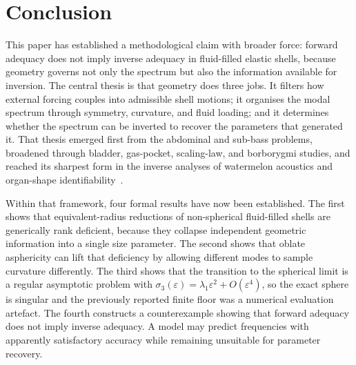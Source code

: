 
\section{Conclusion}
\label{sec:conclusion}

This paper has established a methodological claim with broader force:
forward adequacy does not imply inverse adequacy in fluid-filled elastic shells,
because geometry governs not only the spectrum but also the information
available for inversion.  The central thesis is that geometry does three
jobs.  It filters how external forcing couples into admissible shell motions; it
organises the modal spectrum through symmetry, curvature, and fluid loading; and
it determines whether the spectrum can be inverted to recover the parameters
that generated it.  That thesis emerged first from the abdominal and sub-bass
problems, broadened through bladder, gas-pocket, scaling-law, and borborygmi
studies, and reached its sharpest form in the inverse analyses of watermelon
acoustics and organ-shape identifiability~\cite{BrowntoneP1,BrowntoneP2,BrowntoneP3,BrowntoneP4,BrowntoneP5,BrowntoneP6,BrowntoneP7,BrowntoneP8}.

Within that framework, four formal results have now been established.  The
first shows that equivalent-radius reductions of non-spherical fluid-filled
shells are generically rank deficient, because they collapse independent
geometric information into a single size parameter.  The second shows that
oblate asphericity can lift that deficiency by allowing different modes to
sample curvature differently.  The third shows that the transition to the
spherical limit is a regular asymptotic problem with
$\sigma_3(\varepsilon)=\lambda_1\varepsilon^2+O(\varepsilon^4)$, so the exact
sphere is singular and the previously reported finite floor was a
numerical evaluation artefact.  The fourth constructs a counterexample showing that
forward adequacy does not imply inverse adequacy.  A model may predict
frequencies with apparently satisfactory accuracy while remaining unsuitable for
parameter recovery.


